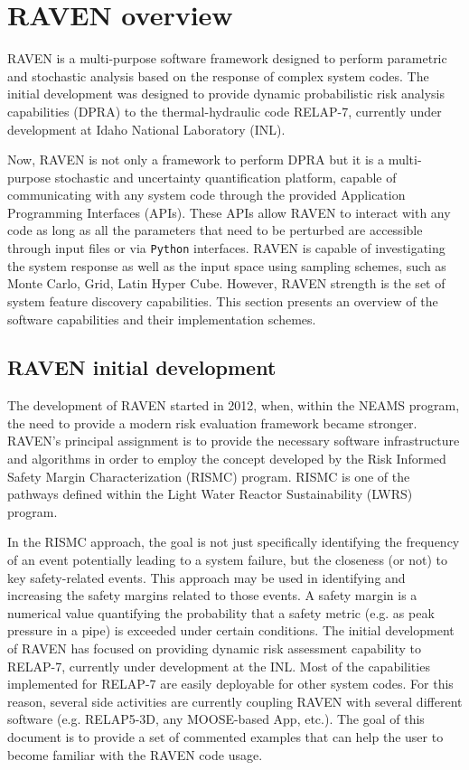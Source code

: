 \section{RAVEN overview}
RAVEN is a multi-purpose software framework designed to perform parametric and stochastic analysis based on the response of complex system codes. The initial development was designed to provide dynamic probabilistic risk analysis capabilities (DPRA) to the thermal-hydraulic code RELAP-7, currently under development
at Idaho National Laboratory (INL).

Now, RAVEN is not only a framework to perform DPRA but it is a multi-purpose stochastic and uncertainty quantification platform, capable of communicating with any system code through the provided  Application Programming Interfaces (APIs). These APIs allow RAVEN to interact with any code as long as all the parameters that need to be perturbed are accessible through input files or via  \texttt{Python} interfaces. RAVEN is capable of investigating the system response as well as the input space using sampling schemes, such as Monte Carlo, Grid, Latin Hyper Cube. However, RAVEN strength is the set of system feature discovery capabilities. This section presents an overview of the software capabilities and their implementation schemes.

\subsection{RAVEN initial development}
The development of RAVEN started in 2012, when, within the NEAMS program, the need to provide a modern risk evaluation framework became stronger. RAVEN’s principal assignment is to provide the necessary software infrastructure and algorithms in order to employ the concept developed by the Risk Informed Safety Margin Characterization (RISMC) program. RISMC is one of the pathways defined within the Light Water Reactor Sustainability (LWRS) program.

In the RISMC approach, the goal is not just specifically identifying the frequency of an event potentially leading to a system failure, but the closeness (or not) to key safety-related events. This approach may be used in identifying and increasing the safety margins related to those events. A safety margin is a numerical value quantifying the probability that a safety metric (e.g. as peak pressure in a pipe) is exceeded under certain conditions.
The initial development of RAVEN has focused on providing dynamic risk assessment capability to RELAP-7, currently under development at the INL.
Most of the capabilities implemented for RELAP-7 are easily deployable for other system codes. For this reason, several side activities  are currently coupling RAVEN with several different software (e.g.  RELAP5-3D, any MOOSE-based App, etc.).
The goal of this document is to provide a set of commented examples that can help the user to become familiar
with the RAVEN code usage.


